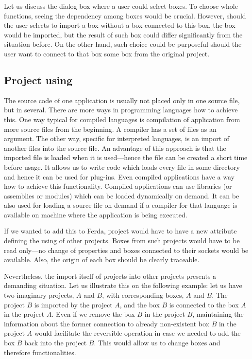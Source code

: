 \documentclass[a4paper,12pt]{book}
\begin{document}
Let us discuss the dialog box where a user could select boxes. To choose whole functions, seeing the dependency among boxes would be crucial. However, should the user selects to import a box without a box connected to this box, the box would be imported, but the result of such box could differ significantly from the situation before. On the other hand, such choice could be purposeful should the user want to connect to that box some box from the original project.

\subsection{Project using}
The source code of one application is usually not placed only in one source file, but in several. There are more ways in programming languages how to achieve this. One way typical for compiled languages is compilation of application from more source files from the beginning. A compiler has a set of files as an argument. The other way, specific for interpreted languages, is an import of another files into the source file. An advantage of this approach is that the imported file is loaded when it is used---hence the file can be created a short time before usage. It allows us to write code which loads every file in some directory and hence it can be used for plug-ins. Even compiled applications have a way how to achieve this functionality. Compiled applications can use libraries (or assemblies or modules) which can be loaded dynamically on demand. It can be also used for loading a source file on demand if a compiler for that language is available on machine where the application is being executed.

If we wanted to add this to Ferda, project would have to have a new attribute defining the using of other projects. Boxes from such projects would have to be read only---no change of properties and boxes connected to their sockets would be available. Also, the origin of each box should be clearly traceable.

Nevertheless, the import itself of projects into other projects presents a demanding situation. Let us illustrate this on the following example: let us have two imaginary projects, $A$ and $B$, with corresponding boxes, $A$ and $B$. The project $B$ is imported by the project $A$, and the box $B$ is connected to the box $A$ in the project $A$. Even if we remove the box $B$ in the project $B$, maintaining the information about the former connection to already non-existent box $B$ in the project $A$ would facilitate the reversible operation in case we needed to add the box $B$ back into the project $B$. This would allow us to change boxes and therefore functionalities.
\end{document}
